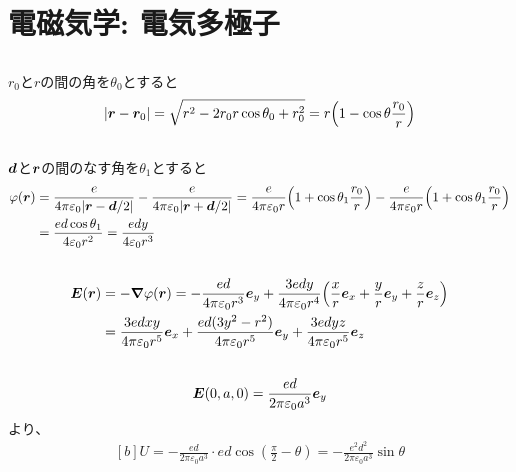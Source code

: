 \documentclass[../../sp_2022.tex]{subfiles}
\begin{document}
\setcounter{section}{2}
\section{電磁気学: 電気多極子}
\subsection{}
\(r_0\)と\(r\)の間の角を\(\theta_0\)とすると
\begin{equation}\begin{aligned}[b]
    \abs{\vb*{r}-\vb*{r}_0} = \sqrt{r^2-2r_0r\cos\theta_0+r_0^2} = r\qty(1-\cos\theta\frac{r_0}{r})
\end{aligned}\end{equation}

\subsection{}
\(\vb*{d}\)と\(\vb*{r}\)の間のなす角を\(\theta_1\)とすると
\begin{equation}\begin{aligned}[b]
    \varphi(\vb*{r})
    &= \frac{e}{4\pi\varepsilon_0\abs{\vb*{r}-\vb*{d}/2}}-\frac{e}{4\pi\varepsilon_0\abs{\vb*{r}+\vb*{d}/2}}
    = \frac{e}{4\pi\varepsilon_0 r}\qty(1+\cos\theta_1\frac{r_0}{r})-\frac{e}{4\pi\varepsilon_0 r}\qty(1+\cos\theta_1\frac{r_0}{r})\\
    &= \frac{ed\cos\theta_1}{4\varepsilon_0r^2}
    = \frac{edy}{4\varepsilon_0r^3}
\end{aligned}\end{equation}

\subsection{}
\begin{equation}\begin{aligned}[b]
    \vb*{E}(\vb*{r})
    &=-\grad\varphi(\vb*{r})
    =-\frac{ed}{4\pi\varepsilon_0r^3}\vb*{e}_y+\frac{3edy}{4\pi\varepsilon_0r^4}\qty(
        \frac{x}{r}\vb*{e}_x+\frac{y}{r}\vb*{e}_y+\frac{z}{r}\vb*{e}_z)\\
    &= \frac{3edxy}{4\pi\varepsilon_0r^5}\vb*{e}_x
    +\frac{ed(3y^2-r^2)}{4\pi\varepsilon_0r^5}\vb*{e}_y
    +\frac{3edyz}{4\pi\varepsilon_0r^5}\vb*{e}_z
\end{aligned}\end{equation}

\subsection{}
\begin{equation}\begin{aligned}[b]
    \vb*{E}(0,a,0) = \frac{ed}{2\pi\varepsilon_0a^3}\vb*{e}_y
\end{aligned}\end{equation}
より、
\begin{equation}\begin{aligned}[b]
    U = - \frac{ed}{2\pi\varepsilon_0a^3} \cdot ed \cos(\frac{\pi}{2}-\theta)
    = - \frac{e^2d^2}{2\pi\varepsilon_0 a^3}\sin\theta
\end{aligned}\end{equation}
\end{document}
